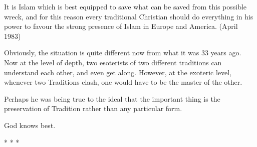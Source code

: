 \begin{quotex}
It is Islam which is best equipped to save what can be saved from this possible wreck, and for this reason every traditional Christian should do everything in his power to favour the strong presence of Islam in Europe and America. (April 1983)
\end{quotex}


Obviously, the situation is quite different now from what it was 33 years ago. Now at the level of depth, two esoterists of two different traditions can understand each other, and even get along. However, at the exoteric level, whenever two Traditions clash, one would have to be the master of the other.

Perhaps he was being true to the ideal that the important thing is the preservation of Tradition rather than any particular form.

God knows best.



\begin{center}* * *\end{center}

